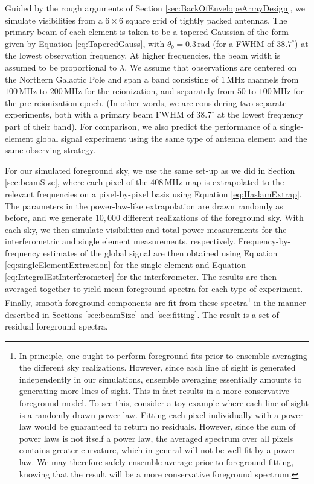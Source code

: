 \documentclass[twocolumn,apj,numberedappendix]{emulateapj}
\newcommand{\acl}[1]{}
\begin{document}
Guided by the rough arguments of Section \ref{sec:BackOfEnvelopeArrayDesign}, we simulate visibilities from a $6\times6$ \acl{Changed here} square grid of tightly packed antennas. The primary beam of each element is taken to be a tapered Gaussian of the form given by Equation \eqref{eq:TaperedGauss}, with $\theta_b = 0.3\,\textrm{rad}$ (for a FWHM of $38.7^\circ$) at the lowest observation frequency. At higher frequencies, the beam width is assumed to be proportional to $\lambda$. We assume that observations are centered on the Northern Galactic Pole and span a band consisting of $1\,\textrm{MHz}$ channels from $100\,\textrm{MHz}$ to $200\,\textrm{MHz}$ for the reionization, and separately from $50$ to $100\,\textrm{MHz}$ for the pre-reionization epoch. (In other words, we are considering two separate experiments, both with a primary beam FWHM of $38.7^\circ$ at the lowest frequency part of their band). For comparison, we also predict the performance of a single-element global signal experiment using the same type of antenna element and the same observing strategy.

For our simulated foreground sky, we use the same set-up as we did in Section \ref{sec:beamSize}, where each pixel of the $408\,\textrm{MHz}$ map is extrapolated to the relevant frequencies on a pixel-by-pixel basis using Equation \eqref{eq:HaslamExtrap}. The parameters in the power-law-like extrapolation are drawn randomly as before, and we generate $10,000$ different realizations of the foreground sky. With each sky, we then simulate visibilities and total power measurements for the interferometric and single element measurements, respectively. Frequency-by-frequency estimates of the global signal are then obtained using Equation \eqref{eq:singleElementExtraction} for the single element and Equation \eqref{eq:IntegralEstInterferometer} for the interferometer. The results are then averaged together to yield mean foreground spectra for each type of experiment. Finally, smooth foreground components are fit from these spectra\footnote{In principle, one ought to perform foreground fits prior to ensemble averaging the different sky realizations. However, since each line of sight is generated independently in our simulations, ensemble averaging essentially amounts to generating more lines of sight. This in fact results in a more conservative foreground model. To see this, consider a toy example where each line of sight is a randomly drawn power law. Fitting each pixel individually with a power law would be guaranteed to return no residuals. However, since the sum of power laws is not itself a power law, the averaged spectrum over all pixels contains greater curvature, which in general will not be well-fit by a power law. We may therefore safely ensemble average prior to foreground fitting, knowing that the result will be a more conservative foreground spectrum.} in the manner described in Sections \ref{sec:beamSize} and \ref{sec:fitting}. The result is a set of residual foreground spectra.
\end{document}
